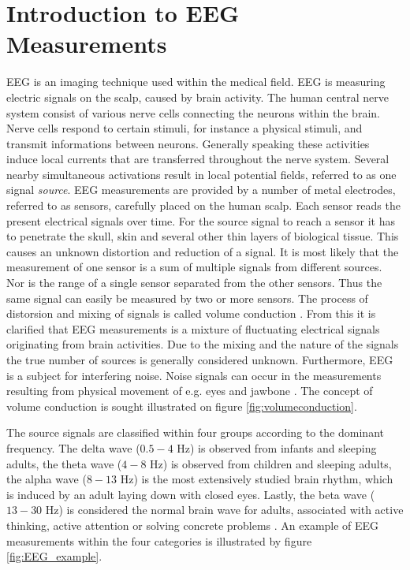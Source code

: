 \section{Introduction to EEG Measurements}\label{sec:EEG}
EEG is an imaging technique used within the medical field. EEG is measuring electric signals on the scalp, caused by brain activity. 
The human central nerve system consist of various nerve cells connecting the neurons within the brain. Nerve cells respond to certain stimuli, for instance a physical stimuli, and transmit informations between neurons.
Generally speaking these activities induce local currents that are transferred throughout the nerve system. 
Several nearby simultaneous activations result in local potential fields, referred to as one signal \textit{source}\cite{EEGsignalprocessing}. 
EEG measurements are provided by a number of metal electrodes, referred to as sensors, carefully placed on the human scalp. 
Each sensor reads the present electrical signals over time.
For the source signal to reach a sensor it has to penetrate the skull, skin and several other thin layers of biological tissue. 
This causes an unknown distortion and reduction of a signal.
It is most likely that the measurement of one sensor is a sum of multiple signals from different sources.
Nor is the range of a single sensor separated from the other sensors. 
Thus the same signal can easily be measured by two or more sensors.
The process of distorsion and mixing of signals is called volume conduction \cite[p. 68]{EEGsignalprocessing} \cite{Van2019}. 
From this it is clarified that EEG measurements  
is a mixture of fluctuating electrical signals originating from brain activities. Due to the mixing and the nature of the signals the true number of sources is generally considered unknown\cite{EEGsignalprocessing}.  
Furthermore, EEG is a subject for interfering noise. Noise signals can occur in the measurements resulting from physical movement of e.g. eyes and jawbone \cite{fundamentalEEG}. The concept of volume conduction is sought illustrated on figure \ref{fig:volumeconduction}.

The source signals are classified within four groups according to the dominant frequency. 
The delta wave ($0.5-4$ Hz) is observed from infants and sleeping adults, the theta wave ($4-8$ Hz) is observed from children and sleeping adults, the alpha wave ($8-13$ Hz) is the most extensively studied brain rhythm, which is induced by an adult laying down with closed eyes. 
Lastly, the beta wave ($13-30$ Hz) is considered the normal brain wave for adults, associated with active thinking, active attention or solving concrete problems \cite[p. 11]{EEGsignalprocessing}. 
An example of EEG measurements within the four categories is illustrated by figure \ref{fig:EEG_example}.   

